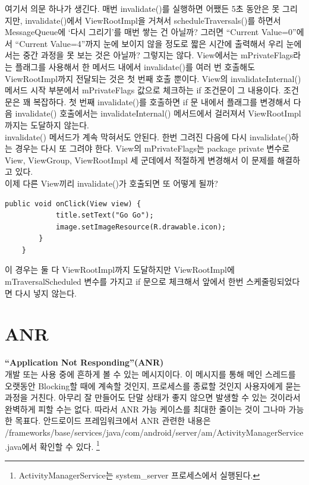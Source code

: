 여기서 의문 하나가 생긴다. 
매번 invalidate()를 실행하면 어쨌든 5초 동안은 못 그리지만, 
invalidate()에서 ViewRootImpl을 거쳐서 scheduleTraversals()를 하면서 MessageQueue에 `다시 그리기'를 매번 쌓는 건 아닐까? 
그러면 ``Current Value=0''에서 ``Current Value=4''까지 눈에 보이지 않을 정도로 짧은 시간에 출력해서 우리 눈에서는 중간 과정을 못 보는 것은 아닐까?
그렇지는 않다. View에서는 mPrivateFlags라는 플래그를 사용해서 한 메서드 내에서 invalidate()를 여러 번 호출해도 ViewRootImpl까지 전달되는 것은 첫 번째 호출 뿐이다. View의 invalidateInternal() 메서드 시작 부분에서 mPrivateFlags 값으로 체크하는 if 조건문이 그 내용이다.
조건문은 꽤 복잡하다. 첫 번째 invalidate()를 호출하면 if 문 내에서 플래그를 변경해서 다음 invalidate() 호출에서는 invalidateInternal() 메서드에서 걸러져서 ViewRootImpl까지는 도달하지 않는다.\\

invalidate() 메서드가 계속 막혀서도 안된다. 
한번 그려진 다음에 다시 invalidate()하는 경우는 다시 또 그려야 한다.
View의 mPrivateFlags는 package private 변수로 View, ViewGroup, ViewRootImpl 세 군데에서 적절하게 변경해서 이 문제를 해결하고 있다.\\

이제 다른 View끼리 invalidate()가 호출되면 또 어떻게 될까?
\begin{lstlisting}[frame=single] 
	public void onClick(View view) {
			title.setText("Go Go");
			image.setImageResource(R.drawable.icon);
		}
	}
\end{lstlisting}
이 경우는 둘 다 ViewRootImpl까지 도달하지만 ViewRootImpl에 mTraversalScheduled 변수를 가지고 if 문으로 체크해서 앞에서 한번 스케줄링되었다면 다시 넣지 않는다.

\section{ANR}
\textbf{``Application Not Responding''(ANR)}\\
개발 또는 사용 중에 흔하게 볼 수 있는 메시지이다. 이 메시지를 통해 메인 스레드를 오랫동안 Blocking할 때에 계속할 것인지, 프로세스를 종료할 것인지 사용자에게 묻는 과정을 거친다. 
아무리 잘 만들어도 단말 상태가 좋지 않으면 발생할 수 있는 것이라서 완벽하게 피할 수는 없다. 따라서 ANR 가능 케이스를 최대한 줄이는 것이 그나마 가능한 목표다.
안드로이드 프레임워크에서 ANR 관련한 내용은 
/frameworks/base/services/java/com/android/server/am/ActivityManagerService.java에서 확인할 수 있다. \footnote{ActivityManagerService는 system\_server 프로세스에서 실행된다.}\\


